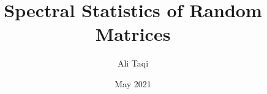 \documentclass[12pt,twoside]{reedthesis}
\title{Spectral Statistics of Random Matrices}
\author{Ali Taqi}
\date{May 2021}
\begin{document}
  \maketitle
  \frontmatter %
  \pagestyle{empty} %



%

    \tableofcontents

    \listoftables \hfill

    \begin{center}

    \Ddisttable \newline

    \hfill \vspace{2em}

    \spectrumschemetable \newline

    \hfill \vspace{2em}

    \dispersiontable \newline

    \hfill \vspace{2em}

    \pairingschemetable \newline

    \end{center}
\end{document}
